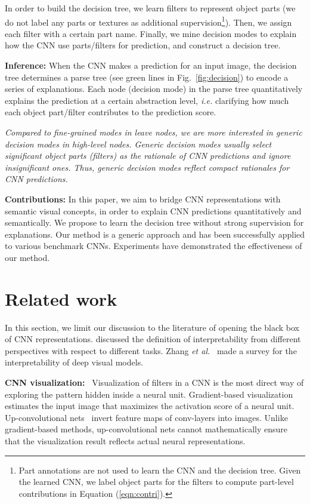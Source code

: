 \documentclass[10pt,twocolumn,letterpaper]{article}
\begin{document}
In order to build the decision tree, we learn filters to represent object parts (we do not label any parts or textures as additional supervision\footnote[3]{Part annotations are not used to learn the CNN and the decision tree. Given the learned CNN, we label object parts for the filters to compute part-level contributions in Equation (\ref{eqn:contri}).}). Then, we assign each filter with a certain part name. Finally, we mine decision modes to explain how the CNN use parts/filters for prediction, and construct a decision tree.

\textbf{Inference:} When the CNN makes a prediction for an input image, the decision tree determines a parse tree (see green lines in Fig.~\ref{fig:decision}) to encode a series of explanations. Each node (decision mode) in the parse tree quantitatively explains the prediction at a certain abstraction level, \emph{i.e.} clarifying how much each object part/filter contributes to the prediction score.

\textit{Compared to fine-grained modes in leave nodes, we are more interested in generic decision modes in high-level nodes. Generic decision modes usually select significant object parts (filters) as the rationale of CNN predictions and ignore insignificant ones. Thus, generic decision modes reflect compact rationales for CNN predictions.}

\textbf{Contributions:} In this paper, we aim to bridge CNN representations with semantic visual concepts, in order to explain CNN predictions quantitatively and semantically. We propose to learn the decision tree without strong supervision for explanations. Our method is a generic approach and has been successfully applied to various benchmark CNNs. Experiments have demonstrated the effectiveness of our method.

\section{Related work}

In this section, we limit our discussion to the literature of opening the black box of CNN representations. \cite{Interpretability,modelInterpretability,modelInterpretability2,modelInterpretability3} discussed the definition of interpretability from different perspectives with respect to different tasks. Zhang \emph{et al.}~\cite{InterpretabilitySurvey} made a survey for the interpretability of deep visual models.

\textbf{CNN visualization:}{\verb| |} Visualization of filters in a CNN is the most direct way of exploring the pattern hidden inside a neural unit. Gradient-based visualization~\cite{CNNVisualization_1,CNNVisualization_2} estimates the input image that maximizes the activation score of a neural unit. Up-convolutional nets~\cite{FeaVisual} invert feature maps of conv-layers into images. Unlike gradient-based methods, up-convolutional nets cannot mathematically ensure that the visualization result reflects actual neural representations.
\end{document}
